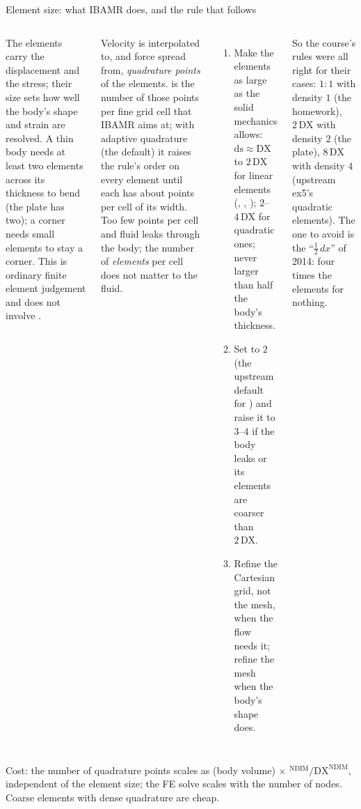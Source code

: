 \documentclass[aspectratio=169,11pt]{beamer}
\begin{document}
\begin{frame}{Element size: what IBAMR does, and the rule that follows}
\label{fr:rules}
\scriptsize
\begin{columns}[T]
 The elements carry the displacement and the stress; their size sets how well the body's shape and strain are resolved. A thin body needs at least two elements across its thickness to bend (the plate has two); a corner needs small elements to stay a corner. This is ordinary finite element judgement and does not involve .

\medskip
{} Velocity is interpolated to, and force spread from, \emph{quadrature points} of the elements.  is the number of those points per fine grid cell that IBAMR aims at; with adaptive quadrature (the default) it raises the rule's order on every element until each has about  points per cell of its width. Too few points per cell and fluid leaks through the body; the number of \emph{elements} per cell does not matter to the fluid.
\begin{enumerate}
  \item Make the elements as large as the solid mechanics allows: $\mathrm{ds} \approx \mathrm{DX}$ to $2\,\mathrm{DX}$ for linear elements (, , ); $2$--$4\,\mathrm{DX}$ for quadratic ones; never larger than half the body's thickness.
  \item Set  to $2$ (the upstream default for ) and raise it to $3$--$4$ if the body leaks or its elements are coarser than $2\,\mathrm{DX}$.
  \item Refine the Cartesian grid, not the mesh, when the flow needs it; refine the mesh when the body's shape does.
\end{enumerate}
So the course's rules were all right for their cases: $1{:}1$ with density $1$ (the homework), $2\,\mathrm{DX}$ with density $2$ (the plate), $8\,\mathrm{DX}$ with density $4$ (upstream ex5's quadratic elements). The one to avoid is the ``$\tfrac12\,dx$'' of 2014: four times the elements for nothing.
\end{columns}
\begin{punchbox}
\footnotesize Cost: the number of quadrature points scales as (body volume) $\times$ $^{\mathrm{NDIM}}/\mathrm{DX}^{\mathrm{NDIM}}$, independent of the element size; the FE solve scales with the number of nodes. Coarse elements with dense quadrature are cheap.
\end{punchbox}
\end{frame}
\end{document}
